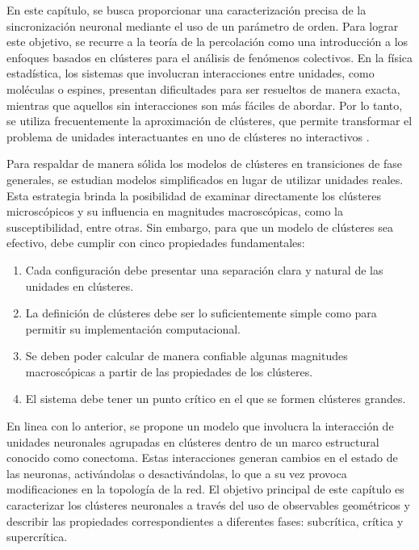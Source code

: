 En este capítulo, se busca proporcionar una caracterización precisa de la sincronización neuronal mediante el uso de un parámetro de orden. Para lograr este objetivo, se recurre a la teoría de la percolación como una introducción a los enfoques basados en clústeres para el análisis de fenómenos colectivos. En la física estadística, los sistemas que involucran interacciones entre unidades, como moléculas o espines, presentan dificultades para ser resueltos de manera exacta, mientras que aquellos sin interacciones son más fáciles de abordar. Por lo tanto, se utiliza frecuentemente la aproximación de clústeres, que permite transformar el problema de unidades interactuantes en uno de clústeres no interactivos \cite{stauffer_scaling_1979}.

Para respaldar de manera sólida los modelos de clústeres en transiciones de fase generales, se estudian modelos simplificados en lugar de utilizar unidades reales. Esta estrategia brinda la posibilidad de examinar directamente los clústeres microscópicos y su influencia en magnitudes macroscópicas, como la susceptibilidad, entre otras. Sin embargo, para que un modelo de clústeres sea efectivo, debe cumplir con cinco propiedades fundamentales:

 \begin{enumerate}[label=(\roman*)]
	\item  Cada configuración debe presentar una separación clara y natural de las unidades en clústeres.
	\item  La definición de clústeres debe ser lo suficientemente simple como para permitir su implementación computacional.
	\item  Se deben poder calcular de manera confiable algunas magnitudes macroscópicas a partir de las propiedades de los clústeres.
	\item  El sistema debe tener un punto crítico en el que se formen clústeres grandes.
\end{enumerate}


En linea con lo anterior, se propone un modelo que involucra la interacción de unidades neuronales agrupadas en clústeres dentro de un marco estructural conocido como conectoma. Estas interacciones generan cambios en el estado de las neuronas, activándolas o desactivándolas, lo que a su vez provoca modificaciones en la topología de la red. El objetivo principal de este capítulo es caracterizar los clústeres neuronales a través del uso de observables geométricos y describir las propiedades correspondientes a diferentes fases: subcrítica, crítica y supercrítica.


